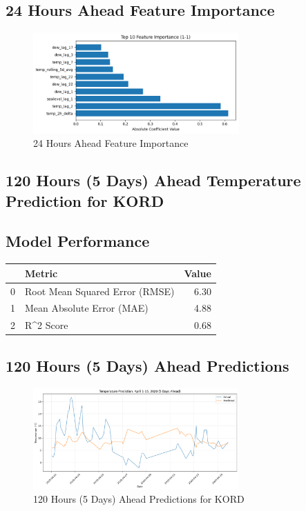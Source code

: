 \subsection{24 Hours Ahead Feature Importance}
\begin{figure}[htbp]
\centering
\includegraphics[width=0.7\textwidth]{1-1-linear_temp_shift_feature_importance.png}
\caption{24 Hours Ahead Feature Importance}
\label{fig:24_hours_ahead_featimp}
\end{figure}



\subsection{120 Hours (5 Days) Ahead Temperature Prediction for KORD}
\subsection{Model Performance}
\begin{tabular}{llr}
\toprule
 & Metric & Value \\
\midrule
0 & Root Mean Squared Error (RMSE) & 6.30 \\
1 & Mean Absolute Error (MAE) & 4.88 \\
2 & R^2 Score & 0.68 \\
\bottomrule
\end{tabular}

\subsection{120 Hours (5 Days) Ahead Predictions}
\begin{figure}[htbp]
\centering
\includegraphics[width=0.7\textwidth]{1-2-linear_temp_shift_results.png}
\caption{120 Hours (5 Days) Ahead Predictions for KORD}
\label{fig:120_hours_(5_days)_ahead_pred}
\end{figure}

